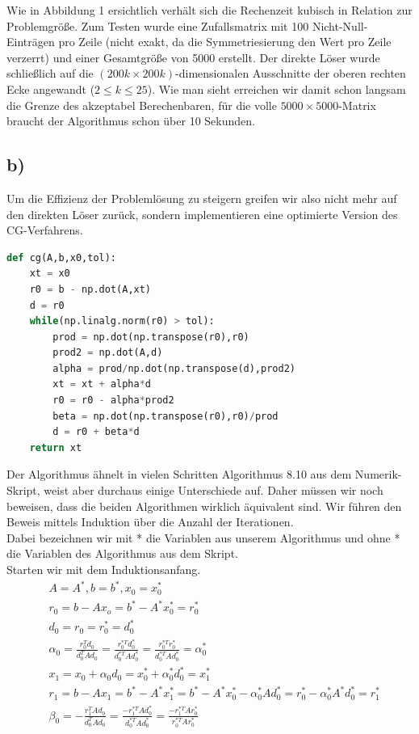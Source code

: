 Wie in Abbildung 1 ersichtlich verhält sich die Rechenzeit kubisch in Relation zur Problemgröße.
Zum Testen wurde eine Zufallsmatrix mit 100 Nicht-Null-Einträgen pro Zeile (nicht exakt, da die Symmetriesierung den Wert pro
Zeile verzerrt) und einer Gesamtgröße von 5000 erstellt. Der direkte Löser wurde schließlich auf die $(200k \times 200k)$-dimensionalen Ausschnitte der oberen rechten Ecke angewandt ($2 \leq k \leq 25$). Wie man sieht erreichen wir damit schon langsam die Grenze
des akzeptabel Berechenbaren, für die volle $5000\times5000$-Matrix braucht der Algorithmus schon über 10 Sekunden.
\FloatBarrier
\subsection*{b)}
Um die Effizienz der Problemlösung zu steigern greifen wir also nicht mehr auf den direkten Löser zurück,
sondern implementieren eine optimierte Version des CG-Verfahrens.
\begin{lstlisting}[language=Python]
def cg(A,b,x0,tol):
    xt = x0
    r0 = b - np.dot(A,xt)
    d = r0
    while(np.linalg.norm(r0) > tol):
        prod = np.dot(np.transpose(r0),r0)
        prod2 = np.dot(A,d)
        alpha = prod/np.dot(np.transpose(d),prod2)
        xt = xt + alpha*d
        r0 = r0 - alpha*prod2
        beta = np.dot(np.transpose(r0),r0)/prod
        d = r0 + beta*d
    return xt
\end{lstlisting} \label{cg}
Der Algorithmus ähnelt in vielen Schritten Algorithmus 8.10 aus dem Numerik-Skript, weist aber durchaus einige Unterschiede auf.
Daher müssen wir noch beweisen, dass die beiden Algorithmen wirklich äquivalent sind.
Wir führen den Beweis mittels Induktion über die Anzahl der Iterationen. \\
Dabei bezeichnen wir mit * die Variablen aus unserem Algorithmus und ohne * die Variablen des Algorithmus
aus dem Skript. \\
Starten wir mit dem Induktionsanfang. \\
\begin{align*}
   &A = A^*, b = b^*, x_0 = x_0^* \\
   &r_0 = b - Ax_o = b^* - A^*x_0^* = r_0^* \\
   &d_0 = r_0 = r_0^* = d_0^* \\
   &\alpha_0 = \frac{r_0^Td_0}{d_0^TAd_0} = \frac{r_0^{*T}d_0^*}{d_0^{*T}Ad_0^*} = \frac{r_0^{*T}r_0^*}{d_0^{*T}Ad_0^*} = \alpha_0^* \\
   &x_1 = x_0 + \alpha_0d_0 = x_0^* + \alpha_0^*d_0^* = x_1^* \\
   &r_1 = b - Ax_1 = b^* - A^*x_1^* = b^* - A^*x_0^* - \alpha_0^*Ad_0^* = r_0^* - \alpha_0^*A^*d_0^* = r_1^* \\
   &\beta_0 = - \frac{r_1^TAd_0}{d_0^TAd_0} = \frac{-r_1^{*T}Ad_0^*}{d_0^{*T}Ad_0^*} = \frac{-r_1^{*T}Ar_0^*}{r_0^{*T}Ar_0^*}
\end{align*}
